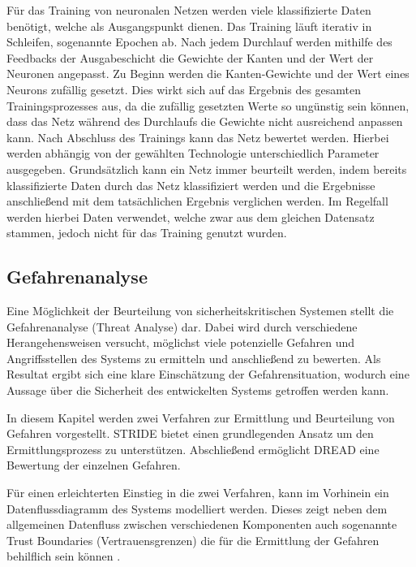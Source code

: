 Für das Training von neuronalen Netzen werden viele klassifizierte Daten benötigt, welche als Ausgangspunkt dienen.
Das Training läuft iterativ in Schleifen, sogenannte Epochen ab.
Nach jedem Durchlauf werden mithilfe des Feedbacks der Ausgabeschicht die Gewichte der Kanten und der Wert der Neuronen angepasst.
Zu Beginn werden die Kanten-Gewichte und der Wert eines Neurons zufällig gesetzt.
Dies wirkt sich auf das Ergebnis des gesamten Trainingsprozesses aus, da die zufällig gesetzten Werte so ungünstig sein können, dass das Netz während des Durchlaufs die Gewichte nicht ausreichend anpassen kann.
Nach Abschluss des Trainings kann das Netz bewertet werden.
Hierbei werden abhängig von der gewählten Technologie unterschiedlich Parameter ausgegeben.
Grundsätzlich kann ein Netz immer beurteilt werden, indem bereits klassifizierte Daten durch das Netz klassifiziert werden und die Ergebnisse anschließend mit dem tatsächlichen Ergebnis verglichen werden.
Im Regelfall werden hierbei Daten verwendet, welche zwar aus dem gleichen Datensatz stammen, jedoch nicht für das Training genutzt wurden.
\autocite[vgl.][]{marcel_mikl_wie_2018}

\subsection{Gefahrenanalyse}

\textauthor{\vLB}{}{}

Eine Möglichkeit der Beurteilung von sicherheitskritischen Systemen stellt die Gefahrenanalyse (Threat Analyse) dar.
Dabei wird durch verschiedene Herangehensweisen versucht, möglichst viele potenzielle Gefahren und Angriffsstellen des Systems zu ermitteln und anschließend zu bewerten.
Als Resultat ergibt sich eine klare Einschätzung der Gefahrensituation, wodurch eine Aussage über die Sicherheit des entwickelten Systems getroffen werden kann.

In diesem Kapitel werden zwei Verfahren zur Ermittlung und Beurteilung von Gefahren vorgestellt.
STRIDE bietet einen grundlegenden Ansatz um den Ermittlungsprozess zu unterstützen.
Abschließend ermöglicht DREAD eine Bewertung der einzelnen Gefahren.

Für einen erleichterten Einstieg in die zwei Verfahren, kann im Vorhinein ein Datenflussdiagramm des Systems modelliert werden.
Dieses zeigt neben dem allgemeinen Datenfluss zwischen verschiedenen Komponenten auch sogenannte Trust Boundaries (Vertrauensgrenzen) die für die Ermittlung der Gefahren behilflich sein können \autocite[vgl.][S. 14]{bundesamt_fur_sicherheit_in_der_informationstechnik_leitfaden_nodate}.


